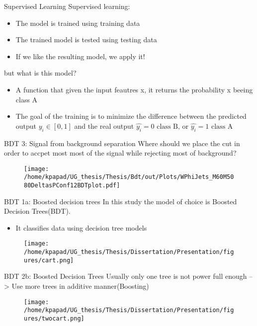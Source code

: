 \documentclass[bigger]{beamer}
\begin{document}
\begin{frame}[label={sec:org9967461}]{Supervised Learning}
\alert{Supervised learning}:
\begin{itemize}
\item The model is trained using training data
\item The trained model is tested using testing data
\item If we like the resulting model, we apply it!
\end{itemize}

\alert{but what is this model?}
\begin{itemize}
\item A function that given the input feautres x, it returns the probability x beeing class A
\item The goal of the training is to minimize the difference between the predicted output \(y_{i} \in [0, 1]\) and the real output \(\hat{y_{i}} = 0\text{ class B, or }\hat{y_{i}} = 1\text{ class A}\)
\end{itemize}
\end{frame}
\begin{frame}[label={sec:orgf5292a0}]{BDT 3: Signal from background separation}
Where should we place the cut in order to accpet most most of the  signal while rejecting most of background?
\begin{figure}[hb]
\centering
\texttt{[image: /home/kpapad/UG\_thesis/Thesis/Bdt/out/Plots/WPhiJets\_M60M5080DeltasPConf12BDTplot.pdf]}
\end{figure}
\end{frame}
\begin{frame}[label={sec:org923fc58}]{BDT 1a: Boosted decision trees}
In this study the model of choice is Boosted Decision Trees(BDT).
\begin{itemize}
\item It classifies data using decision tree models
\end{itemize}
\begin{figure}[h]
\centering
\texttt{[image: /home/kpapad/UG\_thesis/Thesis/Dissertation/Presentation/figures/cart.png]}
\end{figure}
\end{frame}
\begin{frame}[label={sec:org04809c2}]{BDT 2b: Boosted Decision Trees}
Usually only one tree is not power full enough --> Use  more trees in additive manner(Boosting)
\begin{figure}[h]
\centering
\texttt{[image: /home/kpapad/UG\_thesis/Thesis/Dissertation/Presentation/figures/twocart.png]}
\end{figure}
\end{frame}
\end{document}
